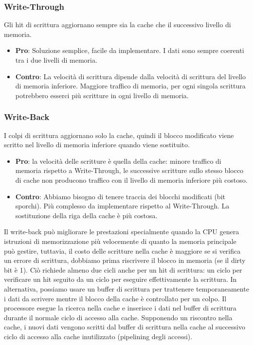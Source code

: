 \subsubsection{Write-Through}
Gli hit di scrittura aggiornano sempre sia la cache che il successivo livello di memoria.
\begin{itemize}
	\item \textbf{Pro}: Soluzione semplice, facile da implementare. I dati sono sempre coerenti tra i due livelli di memoria.
	\item \textbf{Contro}: La velocità di scrittura dipende dalla velocità di scrittura del livello di memoria inferiore. Maggiore traffico di memoria, per ogni singola scrittura potrebbero esserci più scritture in ogni livello di memoria.
\end{itemize}

\subsubsection{Write-Back}
I colpi di scrittura aggiornano solo la cache, quindi il blocco modificato viene scritto nel livello di memoria inferiore quando viene sostituito. 
\begin{itemize}
	\item \textbf{Pro}: la velocità delle scritture è quella della cache: minore traffico di memoria rispetto a Write-Through, le successive scritture sullo stesso blocco di cache non producono traffico con il livello di memoria inferiore più costoso.
	\item \textbf{Contro}: 
	Abbiamo bisogno di tenere traccia dei blocchi modificati (bit sporchi). Più complesso da implementare rispetto al Write-Through. La sostituzione della riga della cache è più costosa.
\end{itemize}
Il write-back può migliorare le prestazioni specialmente quando la CPU genera istruzioni di memorizzazione più velocemente di quanto la memoria principale può gestire, tuttavia, il costo delle scritture nella cache è maggiore se si verifica un errore di scrittura, dobbiamo prima riscrivere il blocco in memoria (se il dirty bit è 1). 
Ciò richiede almeno due cicli anche per un hit di scrittura: un ciclo per verificare un hit seguito da un ciclo per eseguire effettivamente la scrittura. In alternativa, possiamo usare un buffer di scrittura per trattenere temporaneamente i dati da scrivere mentre il blocco della cache è controllato per un colpo. 
Il processore esegue la ricerca nella cache e inserisce i dati nel buffer di scrittura durante il normale ciclo di accesso alla cache. Supponendo un riscontro nella cache, i nuovi dati vengono scritti dal buffer di scrittura nella cache al successivo ciclo di accesso alla cache inutilizzato (pipelining degli accessi).


